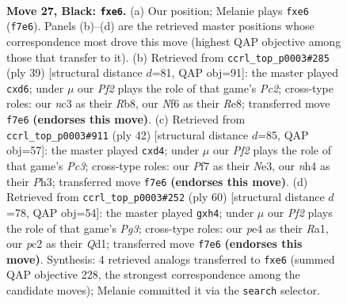 \documentclass[11pt]{article}
\begin{document}
\clearpage

\begin{figure}[p]\centering
\begin{subfigure}{0.46\textwidth}\centering
\resizebox{\linewidth}{!}{%
\newchessgame
\chessboard[
  setfen={1n2r1k1/4qpp1/rp1pBn2/4p2p/P3P2N/2N3P1/2P2P1P/R1R1Q1K1 b - - 0 27},
  showmover=false,
  pgfstyle=straightmove, color=movearrow, markmove={f7-e6}
]}
\caption{}
\end{subfigure}\hfill
\begin{subfigure}{0.46\textwidth}\centering
\resizebox{\linewidth}{!}{%
\newchessgame
\chessboard[
  setfen={1r1qr1k1/1pp2pp1/3B1n1p/p4b2/N7/P5P1/1P2PPBP/2RQR1K1 b - - 0 20},
  showmover=false,
  pgfstyle=straightmove, color=movearrow, markmove={c7-d6}
]}
\caption{}
\end{subfigure}
\\[4pt]
\begin{subfigure}{0.46\textwidth}\centering
\resizebox{\linewidth}{!}{%
\newchessgame
\chessboard[
  setfen={r5k1/2p2pp1/2nqrn1p/p7/P2p4/2P1NN1P/5PP1/R2QR1K1 w - - 0 22},
  showmover=false,
  pgfstyle=straightmove, color=movearrow, markmove={c3-d4}
]}
\caption{}
\end{subfigure}\hfill
\begin{subfigure}{0.46\textwidth}\centering
\resizebox{\linewidth}{!}{%
\newchessgame
\chessboard[
  setfen={7r/1p1knp1r/4p3/1q1pP3/1n1P1N1b/pP2BRP1/P5K1/R2QN3 w - - 0 31},
  showmover=false,
  pgfstyle=straightmove, color=movearrow, markmove={g3-h4}
]}
\caption{}
\end{subfigure}
\caption{\textbf{Move 27, Black: \texttt{fxe6}.} (a) Our position; Melanie plays \texttt{fxe6} (\texttt{f7e6}). Panels (b)--(d) are the retrieved master positions whose correspondence most drove this move (highest QAP objective among those that transfer to it). (b) Retrieved from \texttt{ccrl\_top\_p0003\#285} (ply 39) [structural distance $d$=81, QAP obj=91]: the master played \texttt{cxd6}; under $\mu$ our \emph{Pf2} plays the role of that game's \emph{Pc2}; cross-type roles: our \emph{n}c3 as their \emph{R}b8, our \emph{N}f6 as their \emph{R}e8; transferred move \texttt{f7e6} \textbf{(endorses this move)}. (c) Retrieved from \texttt{ccrl\_top\_p0003\#911} (ply 42) [structural distance $d$=85, QAP obj=57]: the master played \texttt{cxd4}; under $\mu$ our \emph{Pf2} plays the role of that game's \emph{Pc3}; cross-type roles: our \emph{P}f7 as their \emph{N}e3, our \emph{n}h4 as their \emph{P}h3; transferred move \texttt{f7e6} \textbf{(endorses this move)}. (d) Retrieved from \texttt{ccrl\_top\_p0003\#252} (ply 60) [structural distance $d$=78, QAP obj=54]: the master played \texttt{gxh4}; under $\mu$ our \emph{Pf2} plays the role of that game's \emph{Pg3}; cross-type roles: our \emph{p}e4 as their \emph{R}a1, our \emph{p}c2 as their \emph{Q}d1; transferred move \texttt{f7e6} \textbf{(endorses this move)}. Synthesis: 4 retrieved analogs transferred to \texttt{fxe6} (summed QAP objective 228, the strongest correspondence among the candidate moves); Melanie committed it via the \texttt{search} selector.}
\label{fig:thought-m53}
\end{figure}
\end{document}
